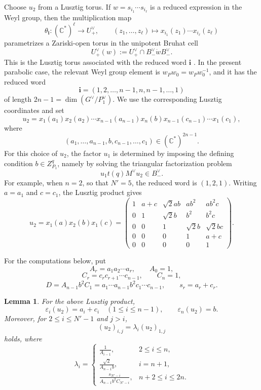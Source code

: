 \documentclass{article}
\newtheorem{lemma}[thm]{Lemma}
\newcommand{\CC}{\mathbb{C}}
\begin{document}
Choose \(u_2\) from a Lusztig torus. If \(w=s_{i_1}\cdots s_{i_\ell}\) is a reduced expression in the Weyl group, then the multiplication map
\[
\theta_{\mathbf i}\colon(\CC^*)^\ell\longrightarrow U_+^\vee,
\qquad
(z_1,\ldots,z_\ell)\longmapsto x_{i_1}(z_1)\cdots x_{i_\ell}(z_\ell)
\]
parametrizes a Zariski-open torus in the unipotent Bruhat cell
\[
U_+^\vee(w):=U_+^\vee\cap B_-^\vee\dot wB_-^\vee .
\]
This is the Lusztig torus associated with the reduced word \(\mathbf i\) \cite{Lusztig,MR}. In the present parabolic case, the relevant Weyl group element is \(w_Pw_0=w_Pw_0^{-1}\), and it has the reduced word
\[
\mathbf i=(1,2,\ldots,n-1,n,n-1,\ldots,1)
\]
of length \(2n-1=\dim(G^\vee/P_1^\vee)\). We use the corresponding Lusztig coordinates and set
\[
u_2=
 x_1(a_1)x_2(a_2)\cdots x_{n-1}(a_{n-1})x_n(b)
 x_{n-1}(c_{n-1})\cdots x_1(c_1),
\]
where
\[
(a_1,\ldots,a_{n-1},b,c_{n-1},\ldots,c_1)\in(\CC^*)^{2n-1}.
\]
For this choice of \(u_2\), the factor \(u_1\) is determined by imposing the defining condition \(b\in Z_{P_1}^q\), namely by solving the triangular factorization problem
\[
u_1t(q)M^\vee u_2\in B_-^\vee.
\]
For example, when \(n=2\), so that \(N'=5\), the reduced word is \((1,2,1)\). Writing \(a=a_1\) and \(c=c_1\), the Lusztig product gives
\[
u_2=x_1(a)x_2(b)x_1(c)
=
\begin{pmatrix}
1&a+c&\sqrt2ab&ab^2&ab^2c\\
0&1&\sqrt2b&b^2&b^2c\\
0&0&1&\sqrt2b&\sqrt2bc\\
0&0&0&1&a+c\\
0&0&0&0&1
\end{pmatrix}.
\]

For the computations below, put
\[
A_r=a_1a_2\cdots a_r,
\qquad
A_0=1,
\]
\[
C_r=c_rc_{r+1}\cdots c_{n-1},
\qquad
C_n=1,
\]
\[
D=A_{n-1}b^2C_1
=a_1\cdots a_{n-1}b^2c_1\cdots c_{n-1},
\qquad
s_r=a_r+c_r.
\]

\begin{lemma}\label{lem:u2-contribution}
For the above Lusztig product,
\[
\varepsilon_i(u_2)=a_i+c_i\quad(1\le i\le n-1),
\qquad
\varepsilon_n(u_2)=b.
\]
Moreover, for \(2\le i\le N'-1\) and \(j>i\),
\begin{equation}\label{eq:u2-entry-relation}
(u_2)_{i,j}=\lambda_i (u_2)_{1,j}
\end{equation}
holds, where
\[
\lambda_i=
\begin{cases}
\displaystyle \frac{1}{A_{i-1}}, & 2\le i\le n,\\[1.1em]
\displaystyle \frac{\sqrt2}{A_{n-1}b}, & i=n+1,\\[1.1em]
\displaystyle \frac{s_{N'-i}}{A_{n-1}b^2C_{N'-i}}, & n+2\le i\le 2n.
\end{cases}
\]
\end{lemma}
\end{document}
